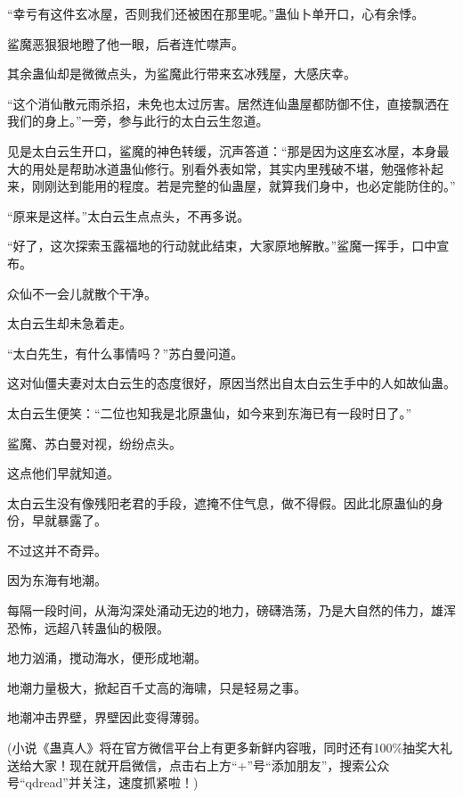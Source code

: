 \begin{this_body}
“幸亏有这件玄冰屋，否则我们还被困在那里呢。”蛊仙卜单开口，心有余悸。

鲨魔恶狠狠地瞪了他一眼，后者连忙噤声。

其余蛊仙却是微微点头，为鲨魔此行带来玄冰残屋，大感庆幸。

“这个消仙散元雨杀招，未免也太过厉害。居然连仙蛊屋都防御不住，直接飘洒在我们的身上。”一旁，参与此行的太白云生忽道。

见是太白云生开口，鲨魔的神色转缓，沉声答道：“那是因为这座玄冰屋，本身最大的用处是帮助冰道蛊仙修行。别看外表如常，其实内里残破不堪，勉强修补起来，刚刚达到能用的程度。若是完整的仙蛊屋，就算我们身中，也必定能防住的。”

“原来是这样。”太白云生点点头，不再多说。

“好了，这次探索玉露福地的行动就此结束，大家原地解散。”鲨魔一挥手，口中宣布。

众仙不一会儿就散个干净。

太白云生却未急着走。

“太白先生，有什么事情吗？”苏白曼问道。

这对仙僵夫妻对太白云生的态度很好，原因当然出自太白云生手中的人如故仙蛊。

太白云生便笑：“二位也知我是北原蛊仙，如今来到东海已有一段时日了。”

鲨魔、苏白曼对视，纷纷点头。

这点他们早就知道。

太白云生没有像残阳老君的手段，遮掩不住气息，做不得假。因此北原蛊仙的身份，早就暴露了。

不过这并不奇异。

因为东海有地潮。

每隔一段时间，从海沟深处涌动无边的地力，磅礴浩荡，乃是大自然的伟力，雄浑恐怖，远超八转蛊仙的极限。

地力汹涌，搅动海水，便形成地潮。

地潮力量极大，掀起百千丈高的海啸，只是轻易之事。

地潮冲击界壁，界壁因此变得薄弱。

(小说《蛊真人》将在官方微信平台上有更多新鲜内容哦，同时还有100\%抽奖大礼送给大家！现在就开启微信，点击右上方“+”号“添加朋友”，搜索公众号“qdread”并关注，速度抓紧啦！)

\end{this_body}

